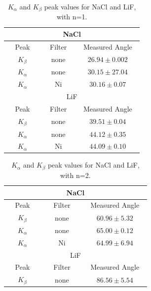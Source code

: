 \documentclass[aps,prl,twocolumn,superscriptaddress]{revtex4-1}
\begin{document}
\begin{table}[H]
	\begin{center}
	\begin{tabular}{ |c|c|c| } 
	 \hline
	 \multicolumn{3}{|c|}{NaCl} \\ 
	 \hline
				Peak & Filter & Measured Angle \\ \hline
				$K_{\beta}$ & none & $26.94\pm0.002$ \\ \hline
				$K_{\alpha}$ & none & $30.15\pm27.04$ \\ \hline
				~~~$K_{\alpha}$~~~&~~~Ni~~~&~~~$30.16\pm0.07$~~~\\ \hline
	\hline \hline
	 \multicolumn{3}{|c|}{LiF} \\
	 \hline
		Peak & Filter & Measured Angle \\ \hline
		$K_{\beta}$ & none & $39.51\pm0.04$ \\ \hline
		$K_{\alpha}$ & none & $44.12\pm0.35$ \\ \hline
		~~~$K_{\alpha}$~~~&~~~Ni~~~&~~~$44.09\pm0.10$~~~\\ \hline
	\end{tabular}
	\caption{ \small{$K_{\alpha}$ and $K_{\beta}$ peak values for NaCl and LiF, with n=1. \label{tab:ne1}}}
	\end{center}
\end{table}

\begin{table}[H]
	\begin{center}
	\begin{tabular}{ |c|c|c| } 
	 \hline
	 \multicolumn{3}{|c|}{NaCl} \\ 
	 \hline
			Peak & Filter & Measured Angle \\ \hline
			$K_{\beta}$ & none & $60.96\pm5.32$ \\ \hline
			$K_{\alpha}$ & none & $65.00\pm0.12$ \\ \hline
			~~~$K_{\alpha}$~~~&~~~Ni~~~&~~~$64.99\pm6.94$~~~\\ \hline
	\hline \hline
	 \multicolumn{3}{|c|}{LiF} \\
	 \hline
			Peak & Filter & Measured Angle \\ \hline
			~~~$K_{\beta}$~~~&~~~none~~~&~~~$86.56\pm5.54$~~~\\ \hline
	\end{tabular}
	\caption{ \small{$K_{\alpha}$ and $K_{\beta}$ peak values for NaCl and LiF, with n=2. \label{tab:ne2}}}
	\end{center}
\end{table}
\end{document}
